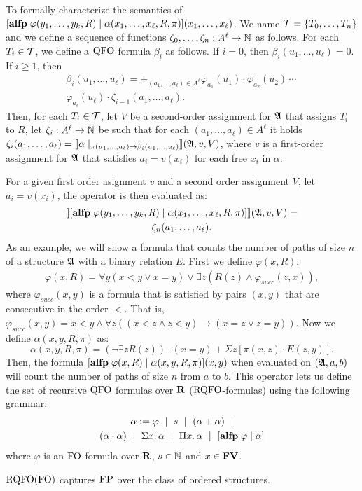 To formally characterize the semantics of $[{\bf alfp} \;\varphi(y_1,\ldots,y_k,R)\mid\alpha(x_1,\ldots,x_{\ell},R,\pi)](x_1,\ldots,x_{\ell})$. %
We name $\mathcal{T} = \{T_0,\ldots,T_n\}$ and we define a sequence of functions $\zeta_0,\ldots,\zeta_n:A^{\ell}\to\mathbb{N}$ as follows. For each $T_i \in \mathcal{T}$, we define a ${\rm QFO}$ formula $\beta_i$ as follows. If $i = 0$, then $\beta_i(u_1,\ldots,u_{\ell}) = 0$. If $i \geq 1$, then
\begin{multline*}
\beta_i(u_1,\ldots,u_{\ell}) = \mathop{+}_{(a_1,\ldots,a_{\ell})\in A^{\ell}} \varphi_{a_1}(u_1)\cdot\varphi_{a_2}(u_2)\,\cdots\,\\ \varphi_{a_{\ell}}(u_{\ell})\cdot \zeta_{i-1}(a_1,\ldots,a_{\ell}).
\end{multline*}
Then, for each $T_i \in \mathcal{T}$, let $V$ be a second-order assignment for $\mathfrak{A}$ that assigns $T_i$ to $R$, let $\zeta_i: A^{\ell}\to\mathbb{N}$ be such that for each $(a_1,\ldots,a_{\ell})\in A^{\ell}$ it holds $\zeta_i(a_1,\ldots,a_{\ell}) = {\llbracket{}{\alpha\mid_{\pi(u_1,\ldots,u_{\ell})\to \beta_i(u_1,\ldots,u_{\ell})}}\rrbracket}(\mathfrak{A},v,V)$, where $v$ is a first-order assignment for $\mathfrak{A}$ that satisfies $a_i = v(x_i)$ for each free $x_i$ in $\alpha$.

For a given first order asignment $v$ and a second order assignment $V$, let $a_i = v(x_i)$, the operator is then evaluated as:
\begin{multline*}
{\llbracket{}{[{\bf alfp} \; \varphi(y_1,\ldots,y_k,R)\mid\alpha(x_1,\ldots,x_{\ell},R,\pi)]}\rrbracket}(\mathfrak{A},v,V) = \\ \zeta_n(a_1,\ldots,a_{\ell}).
\end{multline*}
As an example, we will show a formula that counts the number of paths of size $n$ of a structure $\mathfrak{A}$ with a binary relation $E$. First we define $\varphi(x,R)$:
\begin{multline*}
\varphi(x,R) = \forall y(x < y \vee x = y) \vee \exists z(R(z) \wedge \varphi_{succ}(z,x)),
\end{multline*}
where $\varphi_{succ}(x,y)$ is a formula that is satisfied by pairs $(x,y)$ that are consecutive in the order $<$. That is, $\varphi_{succ}(x,y) = x < y \wedge \forall z((x < z \wedge z < y) \to (x = z \vee z = y) )$. Now we define $\alpha(x,y,R,\pi)$ as:
$$
\alpha(x,y,R,\pi) = (\neg \exists zR(z))\cdot(x = y) + \Sigma z[\pi(x,z)\cdot E(z,y)].
$$
Then, the formula $[{\bf alfp} \;\varphi(x,R)\mid \alpha(x,y,R,\pi)](x,y)$ when evaluated on $(\mathfrak{A},a,b)$ will count the number of paths of size $n$ from $a$ to $b$.
This operator lets us define the set of recursive ${\rm QFO}$ formulas over $\mathbf{R}$ (${\rm RQFO}$-formulas) using the following grammar:
\begin{multline*}
	\label{eq-def-rqfo}
	\alpha := \varphi \ \mid \ s \ \mid \ (\alpha \add \alpha) \ \mid \\ (\alpha \mult \alpha) \ \mid \ \sa{x} \alpha \ \mid \ \pa{x} \alpha \ \mid \ [\alfp \varphi \mid \alpha]
\end{multline*}
where $\varphi$ is an ${\rm FO}$-formula over $\mathbf{R}$, $s \in \mathbb{N}$ and $x \in \mathbf{FV}$.

\begin{theorem}
	${\rm RQFO}({\rm FO})$ captures $\text{\sc FP}$ over the class of ordered structures.
\end{theorem}

